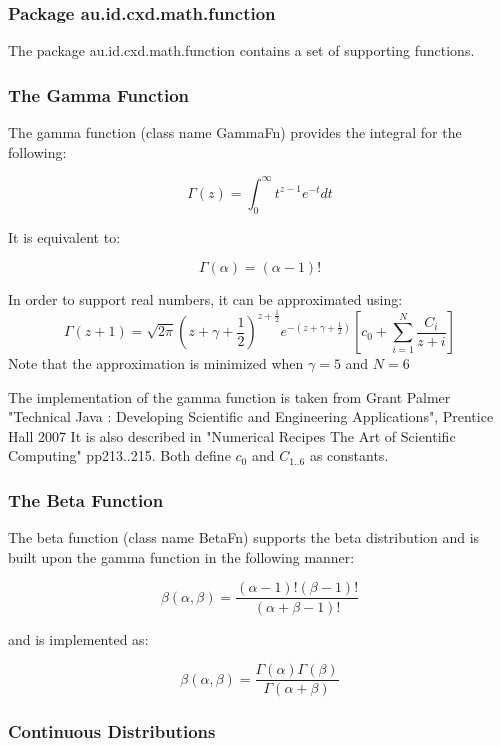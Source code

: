 \documentclass[a4paper]{article}
\begin{document}
\subsubsection*{Package au.id.cxd.math.function}

The package au.id.cxd.math.function contains a set of supporting functions. 

\subsubsection*{The Gamma Function}

The gamma function (class name GammaFn) provides the integral for the following:

$$
  \Gamma(z) = \int_0^\infty  t^{z-1} e^{-t} dt
$$

It is equivalent to:

$$\Gamma(\alpha) = (\alpha - 1)!$$

In order to support real numbers, it can be approximated using:
 $$
   \Gamma(z+1) = \sqrt{2\pi}\left(z + \gamma + \frac{1}{2} \right)^{z + \frac{1}{2}} e^{-\left(z + \gamma + \frac{1}{2} \right)}\left[ c_0 + \sum_{i=1}^N \frac{C_i}{z+i} \right]
 $$
Note that the approximation is minimized when $\gamma = 5$ and $N = 6$

The implementation of the gamma function is taken from
Grant Palmer "Technical Java : Developing Scientific and Engineering Applications", Prentice Hall 2007
It is also described in  "Numerical Recipes The Art of Scientific Computing" pp213..215. Both define $c_0$ and $C_{1..6}$ as constants.


\subsubsection*{The Beta Function}

The beta function (class name BetaFn) supports the beta distribution and is built upon the gamma function in the following manner:

$$\beta(\alpha, \beta) = \frac{ (\alpha - 1)! (\beta - 1)! }{ (\alpha + \beta - 1)! }$$

and is implemented as:

$$
\beta(\alpha, \beta) = \frac{\Gamma(\alpha)\Gamma(\beta)}{\Gamma(\alpha + \beta)}
$$

\subsubsection{Continuous Distributions}
\end{document}
